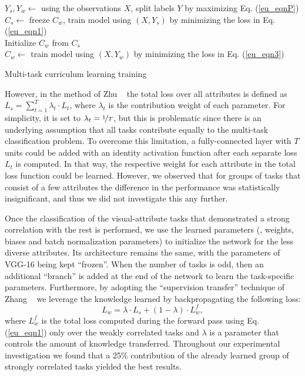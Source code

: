 \documentclass[10pt,twocolumn,letterpaper]{article}
\begin{document}
	\begin{algorithm}[t]
		\(Y_s, Y_w\leftarrow\) using the observations \(X\), split labels \(Y\) by maximizing Eq. (\ref{eu_eqnP})\\
		\(C_s \leftarrow\) freeze \(C_w\), train model using \((X, Y_s)\) by minimizing the loss in Eq. (\ref{eu_eqn1})  \\
		Initialize \(C_w\) from \(C_s\)\\
		\(C_w \leftarrow\) train model using \((X, Y_w)\) by minimizing the loss in Eq. (\ref{eu_eqn3})\\
		\caption{Multi-task curriculum learning training}
		\label{alg1} 
	\end{algorithm}
	
	However, in the method of Zhu \etal~\cite{zhu2016multi} the total loss over all attributes is defined as \(L_s = \sum_{t=1}^{T}\lambda_t \cdot L_t\), where \(\lambda_t\) is the contribution weight of each parameter. For simplicity, it is set to \(\lambda_t = \nicefrac{1}{T}\), but this is problematic since there is an underlying assumption that all tasks contribute equally to the multi-task classification problem. To overcome this limitation, a fully-connected layer with \(T\) units could be added with an identity activation function after each separate loss \(L_t\) is computed. In that way, the respective weight for each attribute in the total loss function could be learned. However, we observed that for groups of tasks that consist of a few attributes the difference in the performance was statistically insignificant, and thus we did not investigate this any further. 
		
	Once the classification of the visual-attribute tasks that demonstrated a strong correlation with the rest is performed, we use the learned parameters (\ie, weights, biases and batch normalization parameters) to initialize the network for the less diverse attributes. Its architecture remains the same, with the parameters of VGG-16 being kept ``frozen''. When the number of tasks is odd, then an additional ``branch'' is added at the end of the network to learn the task-specific parameters. Furthermore, by adopting the ``supervision transfer'' technique of Zhang \etal~\cite{zhang2016real} we leverage the knowledge learned by backpropagating the following loss: 
	\begin{equation} \label{eu_eqn3}
	L_w = \lambda\cdot L_s + (1-\lambda)\cdot L_w^f,
	\end{equation}
	where \(L_w^f\) is the total loss computed during the forward pass using Eq. (\ref{eu_eqn1}) only over the weakly correlated tasks and \(\lambda\) is a parameter that controls the amount of knowledge transferred. Throughout our experimental investigation we found that a 25\% contribution of the already learned group of strongly correlated tasks yielded the best results. 
	
\end{document}
